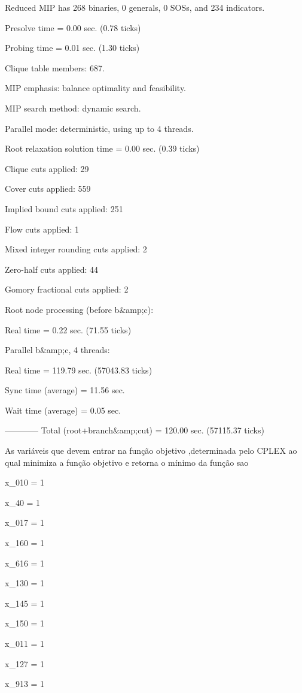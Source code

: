 \documentclass[12pt]{article}
\begin{document}
Reduced MIP has 268 binaries, 0 generals, 0 SOSs, and 234 indicators.

Presolve time = 0.00 sec. (0.78 ticks)

Probing time = 0.01 sec. (1.30 ticks)

Clique table members: 687.

MIP emphasis: balance optimality and feasibility.

MIP search method: dynamic search.

Parallel mode: deterministic, using up to 4 threads.

Root relaxation solution time = 0.00 sec. (0.39 ticks)


Clique cuts applied:  29

Cover cuts applied:  559

Implied bound cuts applied:  251

Flow cuts applied:  1

Mixed integer rounding cuts applied:  2

Zero-half cuts applied:  44

Gomory fractional cuts applied:  2

Root node processing (before b&amp;c):

  Real time             =    0.22 sec. (71.55 ticks)
  
Parallel b&amp;c, 4 threads:

  Real time             =  119.79 sec. (57043.83 ticks)
  
  Sync time (average)   =   11.56 sec.
  
  Wait time (average)   =    0.05 sec.
  
                          ------------
Total (root+branch&amp;cut) =  120.00 sec. (57115.37 ticks)



As variáveis que devem entrar na função objetivo ,determinada pelo CPLEX ao qual minimiza a função objetivo e retorna  o mínimo da função sao \:


x_{010} = 1 

x_{40} = 1

x_{017} = 1

x_{160} = 1

x_{616} = 1

x_{130} = 1

x_{145} = 1

x_{150} = 1

x_{011} = 1

x_{127} = 1

x_{913} = 1
\end{document}
